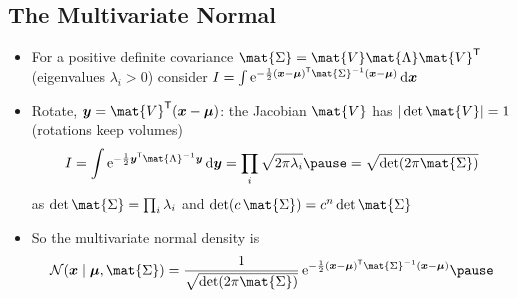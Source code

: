 
\begin{slide}
\section[-2]{The Multivariate Normal}

\begin{PauseHighLight}\squeeze
  \begin{itemize}
  \item For a positive definite covariance $\mat{\Sigma} =
    \mat{V}\mat{\Lambda}\mat{V}^\tr$ (eigenvalues $\lambda_i>0$) consider
    $I = \int \e{-\frac12(\bm{x}-\bm{\mu})^\tr\mat{\Sigma}^{-1}(\bm{x}-\bm{\mu})}
      \,\dd\bm{x}$\pause
  \item Rotate, $\bm{y} = \mat{V}^\tr(\bm{x}-\bm{\mu})$: the Jacobian
    $\mat{V}$ has $|\det\mat{V}| = 1$ (rotations keep volumes)\pause
    \begin{align*}
      I = \int \e{-\frac12\bm{y}^\tr\mat{\Lambda}^{-1}\bm{y}}\,\dd\bm{y}
      = \prod_i\sqrt{2\pi\lambda_i}\pause
      = \sqrt{\det(2\pi\mat{\Sigma})}
    \end{align*}
    as $\det\mat{\Sigma} = \prod_i\lambda_i$ and
    $\det(c\,\mat{\Sigma}) = c^n\det\mat{\Sigma}$\pauseb
  \item So the multivariate normal density is
    \begin{align*}
      \mathcal{N}(\bm{x}\mid\bm{\mu},\mat{\Sigma}) =
      \frac{1}{\sqrt{\det(2\pi\mat{\Sigma})}}\,
      \e{-\frac12(\bm{x}-\bm{\mu})^\tr\mat{\Sigma}^{-1}(\bm{x}-\bm{\mu})}\pause
    \end{align*}
  \end{itemize}
\end{PauseHighLight}

\end{slide}


